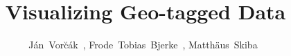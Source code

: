 \documentclass[journal]{IEEEtran}
\begin{document}
%
\title{Visualizing Geo-tagged Data}
%
%
%

\author{J\'{a}n~Vor\u{c}\'{a}k~,
	Frode~Tobias~Bjerke~,
        Matth\"{a}us~Skiba~
        
        }

% 
%



% 
\end{document}
